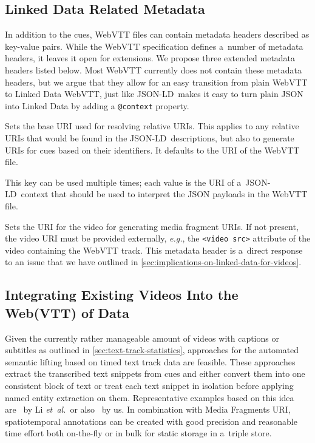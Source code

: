 \documentclass{sig-alternate}
\def\JSONLD{\mbox{JSON-LD}}
\begin{document}
\subsection{Linked Data Related Metadata}

In addition to the cues, WebVTT files can contain
metadata headers described as key-value pairs.
While the WebVTT specification defines a~number of metadata headers,
it leaves it open for extensions.
We propose three extended metadata headers listed below.
Most WebVTT currently does not contain
these metadata headers,
but we argue that they allow for an easy transition
from plain WebVTT to Linked Data WebVTT,
just like \JSONLD\ makes it easy to turn plain JSON into Linked Data
by adding a \texttt{@context} property.

\begin{description}[leftmargin=*]
  \item[@base]
  Sets the base URI used for resolving relative URIs.
  This applies to any relative URIs that would be found in the \JSONLD\ descriptions,
  but also to generate URIs for cues based on their identifiers.
  It defaults to the URI of the WebVTT file.
  \item[@context]
  This key can be used multiple times; each value is the URI
  of a~\JSONLD\ context that should be used to
  interpret the JSON payloads in the WebVTT file.
  \item[@video]
  Sets the URI for the video for generating media fragment URIs.
  If not present, the video URI must be provided externally,
  \emph{e.g.}, the \texttt{<video src>} attribute of the video
  containing the WebVTT track.
  This metadata header is a~direct response to an issue that we
  have outlined in \autoref{sec:implications-on-linked-data-for-videos}.
\end{description}

\subsection{Integrating Existing Videos Into the\\ Web(VTT) of Data}
\label{sec:integrating-existing-videos-into-the-web(vtt)-of-data}

Given the currently rather manageable amount of videos
with captions or subtitles as outlined in \autoref{sec:text-track-statistics},
approaches for the automated semantic lifting
based on timed text track data are feasible. 
These approaches extract the transcribed text snippets from cues
and either convert them into one consistent block of text
or treat each text snippet in isolation
before applying named entity extraction on them.
Representative examples based on this idea
are~\cite{li2013enriching,li2012creating,yi2012synote}
by Li \emph{et~al.}\ or also~\cite{steiner2010semwebvid} by us.
In combination with Media Fragments URI, spatiotemporal annotations
can be created with good precision and reasonable time effort
both on-the-fly or in bulk for static storage in a~triple store.
\end{document}
